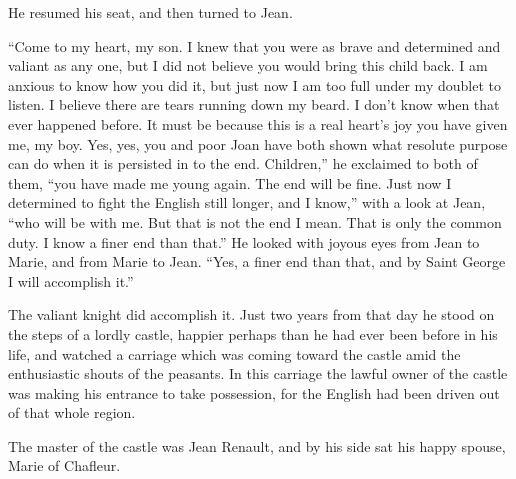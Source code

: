 He resumed his seat, and then turned to Jean.

``Come to my heart, my son. I knew that you were as brave and determined
and valiant as any one, but I did not believe you would bring this child
back. I am anxious to know how you did it, but just now I am too full
under my doublet to listen. I believe there are tears running down my
beard. I don't know when that ever happened before. It must be because
this is a real heart's joy you have given me, my boy. Yes, yes, you and
poor Joan have both shown what resolute purpose can do when it is
persisted in to the end. Children,'' he exclaimed to both of them, ``you
have made me young again. The end will be fine. Just now I determined to
fight the English still longer, and I know,'' with a look at Jean, ``who
will be with me. But that is not the end I mean. That is only the common
duty. I know a finer end than that.'' He looked with joyous eyes from
Jean to Marie, and from Marie to Jean. ``Yes, a finer end than that, and
by Saint George I will accomplish it.''

The valiant knight did accomplish it. Just two years from that day he
stood on the steps of a lordly castle, happier perhaps than he had ever
been before in his life, and watched a carriage which was coming toward
the castle amid the enthusiastic shouts of the peasants. In this
carriage the lawful owner of the castle was making his entrance to take
possession, for the English had been driven out of that whole region.

The master of the castle was Jean Renault, and by his side sat his happy
spouse, Marie of Chafleur.

\threeast
